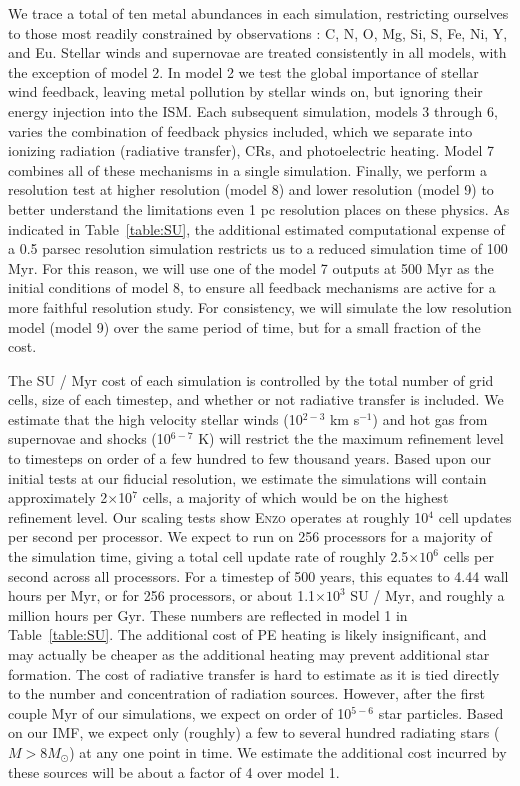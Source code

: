 \documentclass[11pt]{article}
\begin{document}
We trace a total of ten metal abundances in each simulation, restricting ourselves to those most readily constrained by observations \citep[see][and references therein]{Tolstoy2009}: C, N, O, Mg, Si, S, Fe, Ni, Y, and Eu. Stellar winds and supernovae are treated consistently in all models, with the exception of model 2. In model 2 we test the global importance of stellar wind feedback, leaving metal pollution by stellar winds on, but ignoring their energy injection into the ISM. Each subsequent simulation, models 3 through 6, varies the combination of feedback physics included, which we separate into ionizing radiation (radiative transfer), CRs, and photoelectric heating. Model 7 combines all of these mechanisms in a single simulation. Finally, we perform a resolution test at higher resolution (model 8) and lower resolution (model 9) to better understand the limitations even 1 pc resolution places on these physics. As indicated in Table~\ref{table:SU}, the additional estimated computational expense of a 0.5 parsec resolution simulation restricts us to a reduced simulation time of 100 Myr. For this reason, we will use one of the model 7 outputs at 500 Myr as the initial conditions of model 8, to ensure all feedback mechanisms are active for a more faithful resolution study. For consistency, we will simulate the low resolution model (model 9) over the same period of time, but for a small fraction of the cost.

The SU / Myr cost of each simulation is controlled by the total number of grid cells, size of each timestep, and whether or not radiative transfer is included. We estimate that the high velocity stellar winds (10$^{2-3}$ km s$^{-1}$) and hot gas from supernovae and shocks (10$^{6-7}$ K) will restrict the the maximum refinement level to timesteps on order of a few hundred to few thousand years. Based upon our initial tests at our fiducial resolution, we estimate the simulations will contain approximately 2$\times$10$^{7}$ cells, a majority of which would be on the highest refinement level. Our scaling tests show \textsc{Enzo} operates at roughly 10$^{4}$ cell updates per second per processor. We expect to run on 256 processors for a majority of the simulation time, giving a total cell update rate of roughly 2.5$\times 10^{6}$ cells per second across all processors. For a timestep of 500 years, this equates to 4.44 wall hours per Myr, or for 256 processors, or about 1.1$\times 10^{3}$ SU / Myr, and roughly a million hours per Gyr. These numbers are reflected in model 1 in Table~\ref{table:SU}. The additional cost of PE heating is likely insignificant, and may actually be cheaper as the additional heating may prevent additional star formation. The cost of radiative transfer is hard to estimate as it is tied directly to the number and concentration of radiation sources. However, after the first couple Myr of our simulations, we expect on order of 10$^{5-6}$ star particles. Based on our IMF, we expect only (roughly) a few to several hundred radiating stars ($M > 8 M_{\odot}$) at any one point in time. We estimate the additional cost incurred by these sources will be about a factor of 4 over model 1.
\end{document}
